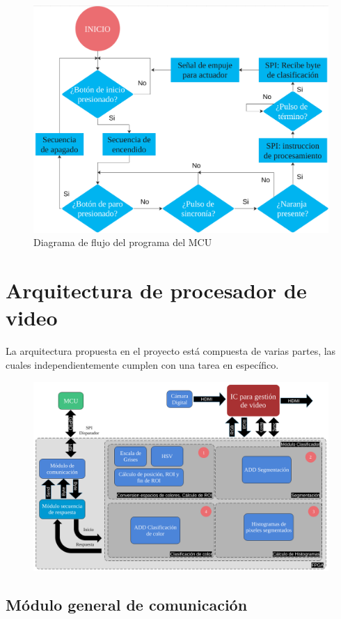 \documentclass[twoside,spanish,ESP,MSc]{plantillaLabUPV}
\theoremstyle{definition}
\begin{document}
\begin{figure}
	\centering
	\includegraphics[width=0.7\linewidth]{edrawimas/MCUprog}
	\caption{Diagrama de flujo del programa del MCU}
	\label{fig:mcuprog}
\end{figure}


\section{Arquitectura de procesador de video}

La arquitectura propuesta en el proyecto está compuesta de varias partes, las cuales independientemente cumplen con una tarea en específico.


\begin{figure}
	\centering
	\includegraphics[width=0.9\linewidth]{edrawimas/arquitectura}
	\caption{}
	\label{fig:arquitectura}
\end{figure}




\subsection{Módulo general de comunicación}
\end{document}
